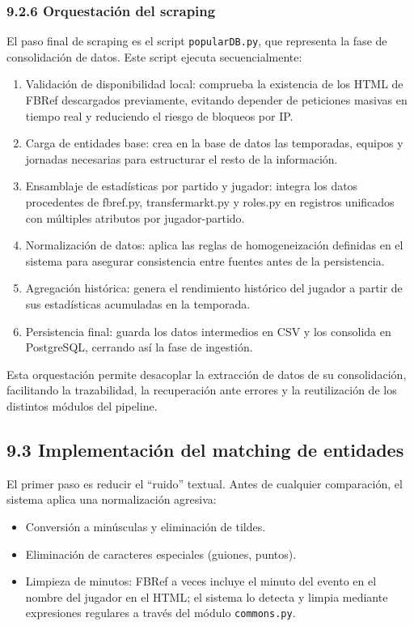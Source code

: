 \subsubsection{9.2.6 Orquestación del scraping}
 
El paso final de scraping es el script \texttt{popularDB.py}, que representa la fase de consolidación de datos. Este script ejecuta secuencialmente:
 
\begin{enumerate}
\item Validación de disponibilidad local: comprueba la existencia de los HTML de FBRef descargados previamente, evitando depender de peticiones masivas en tiempo real y reduciendo el riesgo de bloqueos por IP.
\item Carga de entidades base: crea en la base de datos las temporadas, equipos y jornadas necesarias para estructurar el resto de la información.
\item Ensamblaje de estadísticas por partido y jugador: integra los datos procedentes de fbref.py, transfermarkt.py y roles.py en registros unificados con múltiples atributos por jugador-partido.
\item Normalización de datos: aplica las reglas de homogeneización definidas en el sistema para asegurar consistencia entre fuentes antes de la persistencia.
\item Agregación histórica: genera el rendimiento histórico del jugador a partir de sus estadísticas acumuladas en la temporada.
\item Persistencia final: guarda los datos intermedios en CSV y los consolida en PostgreSQL, cerrando así la fase de ingestión.
\end{enumerate}
 
Esta orquestación permite desacoplar la extracción de datos de su consolidación, facilitando la trazabilidad, la recuperación ante errores y
la reutilización de los distintos módulos del pipeline.
 
\subsection{9.3 Implementación del matching de entidades}
 
El primer paso es reducir el ``ruido'' textual. Antes de cualquier comparación, el sistema aplica una normalización agresiva:
 
\begin{itemize}
\item Conversión a minúsculas y eliminación de tildes.
\item Eliminación de caracteres especiales (guiones, puntos).
\item Limpieza de minutos: FBRef a veces incluye el minuto del evento en el nombre del jugador en el HTML; el sistema lo detecta y limpia mediante expresiones regulares a través del módulo \texttt{commons.py}.
\end{itemize}
 
